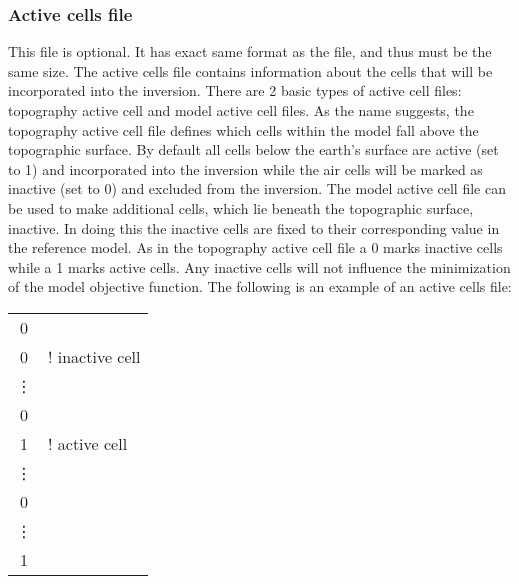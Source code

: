 \subsubsection{Active cells file}
This file is optional. It has exact same format as the  file, and thus must be the same size. The active cells file contains information about the cells that will be incorporated into the inversion. There are 2 basic types of active cell files: topography active cell and model active cell files. As the name suggests, the topography active cell file defines which cells within the model fall above the topographic surface. By default all cells below the earth's surface are active (set to 1) and incorporated into the inversion while the air cells will be marked as inactive (set to 0) and excluded from the inversion. The model active cell file can be used to make additional cells, which lie beneath the topographic surface, inactive. In doing this the inactive cells are fixed to their corresponding value in the reference model. As in the topography active cell file a 0 marks inactive cells while a 1 marks active cells. Any inactive cells will not influence the minimization of the model objective function. The following is an example of an active cells file:
\begin{fileExample}
\begin{tabular}{|cl|}
\hline
0 & \\
0 & ! inactive cell\\
\vdots & \\
0 & \\
1 & ! active cell\\
\vdots & \\
0 & \\
\vdots & \\
1 & \\
\hline
\end{tabular}
\end{fileExample}